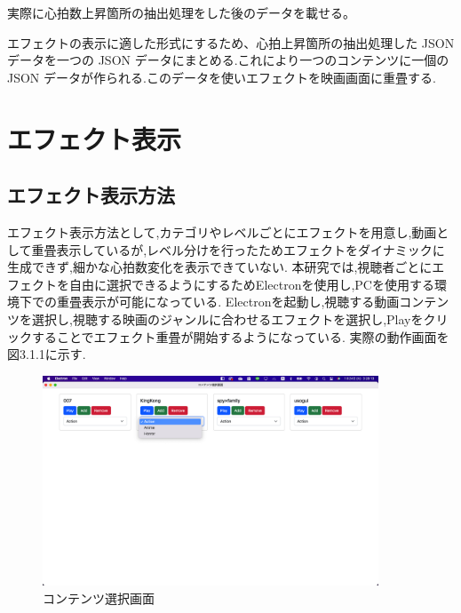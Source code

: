 実際に心拍数上昇箇所の抽出処理をした後のデータを載せる。

エフェクトの表示に適した形式にするため、心拍上昇箇所の抽出処理した JSON データを一つの JSON データにまとめる.これにより一つのコンテンツに一個の JSON データが作られる.このデータを使いエフェクトを映画画面に重畳する.

\section{エフェクト表示}

\subsection{エフェクト表示方法}
エフェクト表示方法として,カテゴリやレベルごとにエフェクトを用意し,動画として重畳表示しているが,レベル分けを行ったためエフェクトをダイナミックに生成できず,細かな心拍数変化を表示できていない.
本研究では,視聴者ごとにエフェクトを自由に選択できるようにするためElectronを使用し,PCを使用する環境下での重畳表示が可能になっている.
Electronを起動し,視聴する動画コンテンツを選択し,視聴する映画のジャンルに合わせるエフェクトを選択し,Playをクリックすることでエフェクト重畳が開始するようになっている.
実際の動作画面を図3.1.1に示す.
\begin{figure}[H]
    \centering
    \includegraphics[width=10cm]{images/chapter3/contents.jpg}
    \caption{コンテンツ選択画面}
    \label{abst}
\end{figure}


